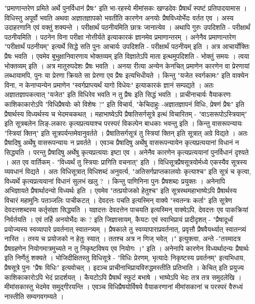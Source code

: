 {"प्रमाणान्तरेण प्रमिते अर्थे पुनर्विधानं प्रैषः" इति भा-रहस्ये मीमांसकः खण्डदेवः प्रैषार्थं स्पष्टं प्रतिपादयामास । विधिस्तु अपूर्वो भवति अथवा अज्ञातज्ञापको भवतीति कारणेन अनयोः प्रैषविध्योर्भेदः वर्तत एव । अस्य उदाहरणानि एवं वक्तुं शक्यन्ते । परीक्षार्थं पठनीयमिति छात्रः जानात्येव । अथापि गुरुः उपदिशति - परीक्षार्थं पठनीयमिति । पठनेन विना परीक्षा नोत्तीर्यते इत्याकारकं ज्ञानमेव प्रमाणान्तरम् । अनेनैव प्रमाणान्तरेण "परीक्षार्थं पठनीयम्" इत्यर्थे सिद्धे सति पुनः आचार्यः उपदिशति - परीक्षार्थं पठनीयम् इति । अत्र आचार्योक्तिः प्रैषः भवति । एवमेव बुभुक्षानिवारणाय भोक्तव्यम् इति विज्ञातेऽपि माता इत्थमुपदिशति - भोक्तुं समयः । त्वया भोक्तव्यम् इति । अत्र मातुरुपदेशः प्रैषः भवति । अनया रीत्या अन्येन केनचित् प्रमाणेन कारणेन वा  प्रेरणायां लब्धायामपि, पुनः या प्रेरणा क्रियते सा प्रेरणा एव प्रैषः इत्यभिधीयते  । किन्तु "यजेत स्वर्गकामः" इति वाक्येन विना, न केनाप्यन्येन प्रमाणेन "स्वर्गप्राप्त्यर्थं यागो विधेयः" इत्याकारकं ज्ञानं सम्पद्यते । अतः अज्ञातज्ञापकत्वात् "यजेत" इति विधिरेव भवति न तु प्रैषः इति सिद्धं भवति । प्राचीनाचार्यः वैयाकरणः काशिकाकारोऽपि "विधिप्रैषयोः को विशेषः ?" इति विचार्य, "केचिदाहुः -अज्ञातज्ञापनं विधिः, प्रेषणं प्रैषः" इति प्रैषार्थस्य विध्यर्थस्य च भेदमचकथत् । महाभाष्येऽपि प्रैषातिसर्गसूत्रे इत्थं विचारितम् - "वाऽसरूपोऽस्त्रियाम्" इति सूत्रबलेन लिङ्-लकारः कृत्यप्रत्ययाश्च परस्परं विकल्पेन बाधकाः भवन्तु इति । किन्तु वासरूपन्यायः "स्त्रियां क्तिन्" इति सूत्रपर्यन्तमेवानुवर्तते । प्रैषातिसर्गसूत्रं तु स्त्रियां क्तिन् इति सूत्रात् अग्रे विद्यते । अतः प्रैषादिषु अर्थेषु वासरूपन्यायः न प्रवर्तते । एवञ्च प्रैषादिषु अर्थेषु वासरूपन्यायेन कृत्यप्रत्ययानां विधानं न सिद्ध्यति । परन्तु प्रैषादिषु अर्थेषु कृत्यप्रत्ययाः इष्टा एव । अनेनैव कारणेन कृत्यप्रत्ययानां पुनर्विधानं दृश्यते । अत एव वार्तिकम् - "विध्यर्थं तु स्त्रियाः प्रागिति वचनात्" इति । विधिसूत्रप्रैषसूत्रयोर्मध्ये एकस्यैव सूत्रस्य व्यवधानं विद्यते । अतः विधिसूत्रात् विधिशब्दं अनुवर्त्य, "अतिसर्गप्राप्तकालयोः कृत्याश्च" इति सूत्रं च कृत्वा, विध्यर्थे कृत्यप्रत्ययानां विधानं सुलभं खलु ? । किन्तु पाणिनिना पुनः प्रैषशब्दः प्रयुक्तः । अनेनापि अभिज्ञायते प्रैषार्थादन्यो विध्यर्थः इति । एवमेव "तत्प्रयोजको हेतुश्च" इति सूत्रस्थमहाभाष्येऽपि प्रैषार्थस्य विचारं महामुनिः पतञ्जलिः पाचीकटत् ।  देवदत्तः पचति इत्यस्मिन् वाक्ये "स्वतन्त्रः कर्ता" इति सूत्रेण देवदत्तशब्दस्य कर्तृसंज्ञा सिद्ध्यति । यज्ञदत्तः देवदत्तेन पाचयति इत्यस्मिन् वाक्येऽपि, देवदत्तः एव पाकक्रियां निर्वर्तयति । एवं तर्हि अनयोर्भेदः कः ? इति जिज्ञासायम्, कैयटः एवं स्वाभिप्रायं प्रादीदृशत्  - "प्रैषादूर्ध्वं प्रयोज्यस्य स्वव्यापारे प्रवर्तनात् स्वातन्त्र्यम् । प्रैषकाले तु स्वव्यापाराप्रवर्तनात्, प्रवृत्तौ प्रैषवैयर्थ्यात् स्वातन्त्र्यं नास्ति । तस्य च  प्रयोजको न हेतुः स्यात् । ततश्च अत्र न णिज् भवेत् ।" इत्युक्त्वा, अन्ते -"तस्मादत्र प्रैषग्रहणेन नियोगमात्रमुच्यते न तु निकृष्टविषय एव नियोगः ।" इति । अनेनापि कारणेन विध्यर्थादन्यः प्रैषार्थः इति निर्णेतुं शक्यते । भोजिदीक्षितस्तु विधिसूत्रे - "विधिः प्रेरणम्, भृत्यादेः निकृष्टस्य प्रवर्तनम्" इत्यभिधाय, प्रैषसूत्रे पुनः "प्रैषः विधिः" इत्यवोचत् । इदञ्च प्राचीनाभिप्रायविरुद्धमस्तीति प्रतिभाति । केचित् इति प्रयुज्य काशिकाकारोऽपि भेदं प्रादर्शयत् । कैयटोऽपि प्रैषार्थं स्फुटं बभाषे । भाष्येऽपि भेदः तत्र तत्र समुदलेखि । मीमांसकास्तु भेदमेव समुद्गीरयन्ति । एवञ्च विधिप्रैषयोर्विषये  वैयाकरणानां मीमांसकानां च परस्परं वैरुध्यं नास्तीति सम्यगवगम्यते ।

}
